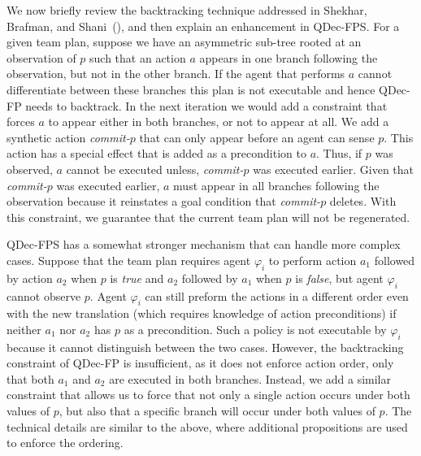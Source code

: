 \documentclass[letterpaper]{article} %
\theoremstyle{definition}
\begin{document}
{We now briefly review the backtracking technique addressed in Shekhar, Brafman, and Shani~(\citeyear{ShekharBS19}), and then explain an enhancement in QDec-FPS.
For a given team plan, suppose we have an asymmetric sub-tree rooted at an observation of $p$ such that an action $a$ appears in one branch following the observation, but not in the other branch.  If the agent that performs $a$ cannot differentiate between these branches
this plan is not executable and hence QDec-FP needs to backtrack.
In the next iteration we would add a constraint that forces $a$ to appear either in both branches, or not to appear at all.
We add a synthetic action {\em commit-$p$} that can only appear before an agent can sense $p$.
This action has a special effect that is added as a precondition to $a$.
Thus, if $p$ was observed, $a$ cannot be executed unless, {\em commit-$p$} was executed earlier.  Given
that {\em commit-$p$} was executed earlier,  $a$ must appear in all branches following the observation because
it reinstates a goal condition that {\em commit-$p$} deletes.
With this constraint, we guarantee that the current team plan will not be regenerated.

QDec-FPS has a somewhat stronger mechanism that can handle more complex cases.
Suppose that the team plan requires agent $\varphi_i$ to perform action $a_1$ followed by action $a_2$ when $p$ is {\em true} and $a_2$ followed by $a_1$ when $p$ is {\em false}, but agent $\varphi_i$ cannot observe $p$.
Agent $\varphi_i$ can still preform the actions in a different order even with the new translation (which requires knowledge of action preconditions) if neither $a_1$ nor $a_2$ has $p$ as a precondition.
Such a policy is not executable by $\varphi_i$ because it cannot distinguish between the two cases.
However, the backtracking constraint of QDec-FP is insufficient, as it does not enforce action order, only that both $a_1$ and $a_2$ are executed in both branches.
Instead, we add a similar constraint that allows us to force that not only a single action occurs under both values of $p$, but also that a specific branch will occur under both values of $p$.
The technical details are similar to the above, where additional propositions are used to enforce the ordering.
}
%
\end{document}
